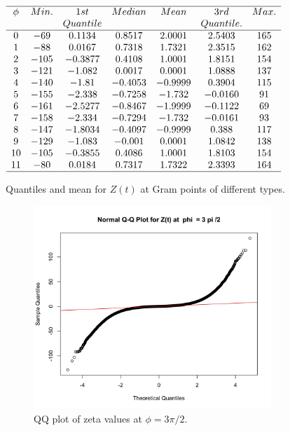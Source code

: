 \documentclass[twoside]{article}
\theoremstyle{definition}
\begin{document}
\begin{table}
\centering \(\begin{array}{ccccccc}
\hline
 \phi &     Min.   & 1st    &  Median    &   Mean   & 3rd    &   Max. \\
  &              & Quantile   &            &              & Quantile.    &   \\
\hline
0 & -69 & 0.1134 & 0.8517 & 2.0001 & 2.5403 & 165 \\
1 & -88 & 0.0167 & 0.7318 & 1.7321 & 2.3515 & 162\\
2 & -105 & -0.3877 & 0.4108 & 1.0001 & 1.8151 & 154\\
3 & -121 & -1.082 & 0.0017 & 0.0001 & 1.0888 & 137\\
4 & -140 & -1.81 & -0.4053 & -0.9999 & 0.3904 & 115 \\
5 & -155 & -2.338 & -0.7258 & -1.732 & -0.0160 & 91\\
6 & -161 & -2.5277 & -0.8467 & -1.9999 & -0.1122 & 69\\
7 & -158 & -2.334 & -0.7294 & -1.732 & -0.0161 & 93\\
8 & -147 & -1.8034 & -0.4097 & -0.9999 & 0.388 & 117\\
9 & -129 & -1.083 & -0.001 & 0.0001 & 1.0842 & 138\\
10 & -105 & -0.3855 & 0.4086 & 1.0001 & 1.8103 & 154\\
11 & -80 & 0.0184 & 0.7317 & 1.7322 & 2.3393 & 164 \\
\hline
\end{array}\)
\caption{Quantiles and mean for  $Z(t)$ at Gram points of different types.}
\label{tab:quantiles6}
\end{table}

\begin{figure}
\includegraphics[width=0.8\textwidth]{qqplot.jpg}
\caption[]{ 
 QQ plot of zeta values at $\phi = 3\pi/2$.
  }
\vspace{1mm}
\label{qqplot}
\end{figure}
\end{document}

